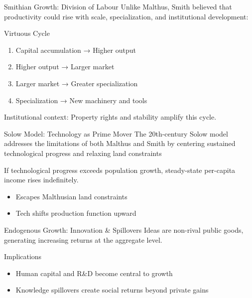 \documentclass[aspectratio=169]{beamer}
\begin{document}
\begin{frame}{Smithian Growth: Division of Labour}
	Unlike Malthus, Smith believed that productivity could rise with
	scale, specialization, and institutional development:
  \begin{block}{Virtuous Cycle}
    \begin{enumerate}[<+->]
      \item Capital accumulation → Higher output  
      \item Higher output → Larger market  
      \item Larger market → Greater specialization  
      \item Specialization → New machinery and tools  
    \end{enumerate}
  \end{block}
  Institutional context: Property rights and stability amplify this cycle.
\end{frame}

\begin{frame}{Solow Model: Technology as Prime Mover}
	The 20th-century Solow model addresses the limitations of both Malthus and
	Smith by centering sustained technological progress and relaxing land constraints
  \begin{theorem}
    If technological progress exceeds population growth, steady-state per-capita income rises indefinitely.
  \end{theorem}
  \vspace{0.5em}
  \begin{itemize}[<+->]
    \item Escapes Malthusian land constraints  
    \item Tech shifts production function upward  
  \end{itemize}
\end{frame}

\begin{frame}{Endogenous Growth: Innovation \& Spillovers}
  Ideas are non-rival public goods, generating increasing returns at the aggregate level.
  \vspace{0.5em}
  \begin{block}{Implications}
    \begin{itemize}[<+->]
      \item Human capital and R\&D become central to growth  
      \item Knowledge spillovers create social returns beyond private gains  
    \end{itemize}
  \end{block}
\end{frame}
\end{document}
